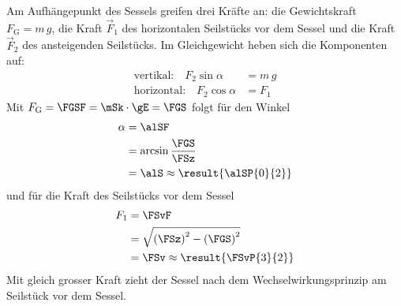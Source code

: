 \begin{center}
\end{center}

Am Aufhängepunkt des Sessels greifen drei Kräfte an: die Gewichtskraft $F_\text{G} = m\,g$, die Kraft $\vec F_1$ des horizontalen Seilstücks vor dem Sessel und die Kraft $\vec F_2$ des ansteigenden Seilstücks. Im Gleichgewicht heben sich die Komponenten auf:
\begin{align}
 \text{vertikal:}\quad F_2\sin\alpha &= m\,g \\
 \text{horizontal:}\quad F_2\cos\alpha &= F_1
\end{align}
Mit $F_\text{G} = \FGSF = \mSk\cdot\gE = \FGS$ folgt für den Winkel
\begin{align}
 \alpha &= \alSF \\
   &= \arcsin\frac{\FGS}{\FSz} \\
   &= \alS \approx \result{\alSP{0}{2}}
\end{align}
und für die Kraft des Seilstücks vor dem Sessel
\begin{align}
 F_1 &= \FSvF \\
   &= \sqrt{\left(\FSz\right)^2-\left(\FGS\right)^2} \\
   &= \FSv \approx \result{\FSvP{3}{2}}
\end{align}
Mit gleich grosser Kraft zieht der Sessel nach dem Wechselwirkungsprinzip am Seilstück vor dem Sessel.
